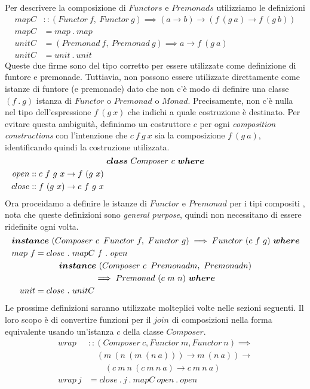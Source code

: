 Per descrivere la composizione di $Functors$ e $Premonads$ utilizziamo le
definizioni
\begin{align*}
  mapC &:: (Functor\ f,\ Functor\ g) \implies (a \to b) \to
  (f \ (g \ a) \to f\ (g\ b))\\
  mapC &= map\ .\ map\\
  unitC &= (Premonad\ f,\ Premonad\ g) \implies a \to f\ (g\ a)\\
  unitC &= unit\ .\ unit
\end{align*}
Queste due firme sono del tipo corretto per essere utilizzate come definizione
di funtore e premonade.
Tuttiavia, non possono essere utilizzate direttamente come istanze di funtore (e
premonade) dato che non c'è modo di definire una classe $(f\ .\ g)$ istanza
di $Functor$ o $Premonad$ o $Monad$.
Precisamente, non c'è nulla nel tipo dell'espressione $f\ (g\ x)$ che indichi
a quale costruzione è destinato.
Per evitare questa ambiguità, definiamo un costruttore $c$ per ogni
\textit{composition constructions} con l'intenzione che $c\ f\ g\ x$ sia la
composizione $f\ (g\ a)$, identificando quindi la costruzione utilizzata.
\begin{align*}
  \classdef{\bm{class}\ Composer\ c\ \bm{where}}
  open &:: c\ f\ g\ x \to f\ (g\ x)\\
  close &:: f\ (g\ x) \to c\ f\ g\ x
\end{align*}
Ora proceidamo a definire le istanze di $Functor$ e $Premonad$ per i tipi compositi
, nota che queste definizioni sono \textit{general purpose}, quindi non necessitano di essere
ridefinite ogni volta.
\begin{align*}
  \classdef{\bm{instance}\ (Composer\ c\,\ Functor\ f,\ Functor\ g) \implies Functor\ (c\ f\ g)\  \bm{where}}
  map\ f &= close\ .\ mapC\ f\ .\ open\\
  \classdef{\bm{instance}\ (Composer\ c\,\ Premonad m,\ Premonad n)}
  \classdef{\implies Premonad\ (c\ m\ n)\  \bm{where}}
  unit &= close\ .\ unitC
\end{align*}
Le prossime definizioni saranno utilizzate molteplici volte nelle sezioni
seguenti.
Il loro scopo è di convertire funzioni per il $join$ di composizioni nella forma
equivalente usando un'istanza $c$ della classe $Composer$.
\begin{align*}
  wrap &:: (Composer\ c, Functor\ m, Functor\ n) \implies\\
       &\quad (m\ (n\ (m\ (n\ a))) \to m\ (n\ a)) \to\\
       &\qquad (c\ m\ n\ (c\ m\ n\ a) \to c\ m\ n\ a)\\
  wrap\ j &= close\ .\ j\ .\ mapC\ open\ .\ open
\end{align*}
